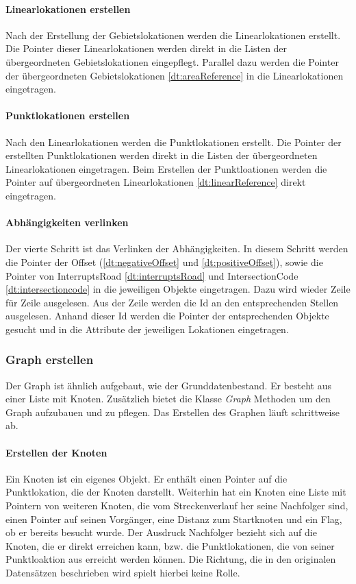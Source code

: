 \documentclass[12pt, a4paper, ngerman]{article}
\begin{document}
\paragraph{Linearlokationen erstellen}
Nach der Erstellung der Gebietslokationen werden die Linearlokationen erstellt. Die Pointer dieser Linearlokationen werden direkt in die Listen der übergeordneten Gebietslokationen eingepflegt. Parallel dazu werden die Pointer der übergeordneten Gebietslokationen \ref{dt:areaReference} in die Linearlokationen eingetragen.

\paragraph{Punktlokationen erstellen}
Nach den Linearlokationen werden die Punktlokationen erstellt. Die Pointer der erstellten Punktlokationen werden direkt in die Listen der übergeordneten Linearlokationen eingetragen. Beim Erstellen der Punktloationen werden die Pointer auf übergeordneten Linearlokationen \ref{dt:linearReference} direkt eingetragen.

\paragraph{Abhängigkeiten verlinken} 
Der vierte Schritt ist das Verlinken der Abhängigkeiten. In diesem Schritt werden die Pointer der Offset (\ref{dt:negativeOffset} und \ref{dt:positiveOffset}), sowie die Pointer von InterruptsRoad \ref{dt:interruptsRoad} und IntersectionCode \ref{dt:intersectioncode} in die jeweiligen Objekte eingetragen. Dazu wird wieder Zeile für Zeile ausgelesen. Aus der Zeile werden die Id an den entsprechenden Stellen ausgelesen. Anhand dieser Id werden die Pointer der entsprechenden Objekte gesucht und in die Attribute der jeweiligen Lokationen eingetragen.

\subsubsection{Graph erstellen}
Der Graph ist ähnlich aufgebaut, wie der Grunddatenbestand. Er besteht aus einer Liste mit Knoten. Zusätzlich bietet die Klasse \textit{Graph}  Methoden um den Graph aufzubauen und zu pflegen. Das Erstellen des Graphen läuft schrittweise ab.

\paragraph{Erstellen der Knoten \label{knotenErstellen}}
Ein Knoten ist ein eigenes Objekt. Er enthält einen Pointer auf die Punktlokation, die der Knoten darstellt. Weiterhin hat ein Knoten eine Liste mit Pointern von weiteren Knoten, die vom Streckenverlauf her seine Nachfolger sind, einen Pointer auf seinen Vorgänger, eine Distanz zum Startknoten und ein Flag, ob er bereits besucht wurde. Der Ausdruck Nachfolger bezieht sich auf die Knoten, die er direkt erreichen kann, bzw. die Punktlokationen, die von seiner Punktloaktion aus erreicht werden können. Die Richtung, die in den originalen Datensätzen beschrieben wird spielt hierbei keine Rolle.
\end{document}

